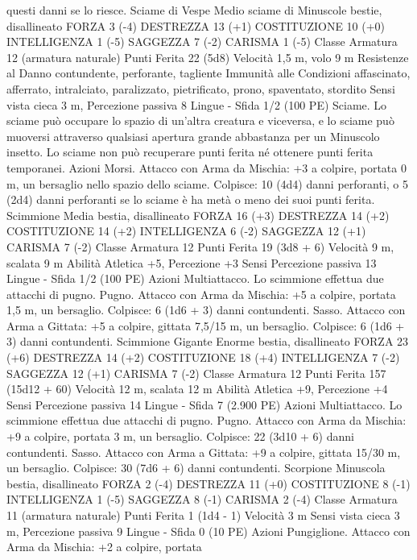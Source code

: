 \begin{multicols}{2}
questi danni se lo riesce.
Sciame di Vespe
Medio sciame di Minuscole bestie, disallineato
FORZA 3 (-4)
DESTREZZA 13 (+1)
COSTITUZIONE 10 (+0)
INTELLIGENZA 1 (-5)
SAGGEZZA 7 (-2)
CARISMA 1 (-5)
Classe Armatura 12 (armatura naturale)
Punti Ferita 22 (5d8)
Velocità 1,5 m, volo 9 m
Resistenze al Danno contundente, perforante, tagliente
Immunità alle Condizioni affascinato, afferrato, intralciato,
paralizzato, pietrificato, prono, spaventato, stordito
Sensi vista cieca 3 m, Percezione passiva 8
Lingue -
Sfida 1/2 (100 PE)
Sciame. Lo sciame può occupare lo spazio di un’altra creatura e
viceversa, e lo sciame può muoversi attraverso qualsiasi apertura
grande abbastanza per un Minuscolo insetto. Lo sciame non può
recuperare punti ferita né ottenere punti ferita temporanei.
Azioni
Morsi. Attacco con Arma da Mischia: +3 a colpire, portata 0 m,
un bersaglio nello spazio dello sciame.
Colpisce: 10 (4d4) danni perforanti, o 5 (2d4) danni perforanti se
lo sciame è ha metà o meno dei suoi punti ferita.
Scimmione
Media bestia, disallineato
FORZA 16 (+3)
DESTREZZA 14 (+2)
COSTITUZIONE 14 (+2)
INTELLIGENZA 6 (-2)
SAGGEZZA 12 (+1)
CARISMA 7 (-2)
Classe Armatura 12
Punti Ferita 19 (3d8 + 6)
Velocità 9 m, scalata 9 m
Abilità Atletica +5, Percezione +3
Sensi Percezione passiva 13
Lingue -
Sfida 1/2 (100 PE)
Azioni
Multiattacco. Lo scimmione effettua due attacchi di pugno.
Pugno. Attacco con Arma da Mischia: +5 a colpire, portata 1,5
m, un bersaglio.
Colpisce: 6 (1d6 + 3) danni contundenti.
Sasso. Attacco con Arma a Gittata: +5 a colpire, gittata 7,5/15
m, un bersaglio.
Colpisce: 6 (1d6 + 3) danni contundenti.
Scimmione Gigante
Enorme bestia, disallineato
FORZA 23 (+6)
DESTREZZA 14 (+2)
COSTITUZIONE 18 (+4)
INTELLIGENZA 7 (-2)
SAGGEZZA 12 (+1)
CARISMA 7 (-2)
Classe Armatura 12
Punti Ferita 157 (15d12 + 60)
Velocità 12 m, scalata 12 m
Abilità Atletica +9, Percezione +4
Sensi Percezione passiva 14
Lingue -
Sfida 7 (2.900 PE)
Azioni
Multiattacco. Lo scimmione effettua due attacchi di pugno.
Pugno. Attacco con Arma da Mischia: +9 a colpire, portata 3 m,
un bersaglio.
Colpisce: 22 (3d10 + 6) danni contundenti.
Sasso. Attacco con Arma a Gittata: +9 a colpire, gittata 15/30 m,
un bersaglio.
Colpisce: 30 (7d6 + 6) danni contundenti.
Scorpione
Minuscola bestia, disallineato
FORZA 2 (-4)
DESTREZZA 11 (+0)
COSTITUZIONE 8 (-1)
INTELLIGENZA 1 (-5)
SAGGEZZA 8 (-1)
CARISMA 2 (-4)
Classe Armatura 11 (armatura naturale)
Punti Ferita 1 (1d4 - 1)
Velocità 3 m
Sensi vista cieca 3 m, Percezione passiva 9
Lingue -
Sfida 0 (10 PE)
Azioni
Pungiglione. Attacco con Arma da Mischia: +2 a colpire, portata

\end{multicols}
